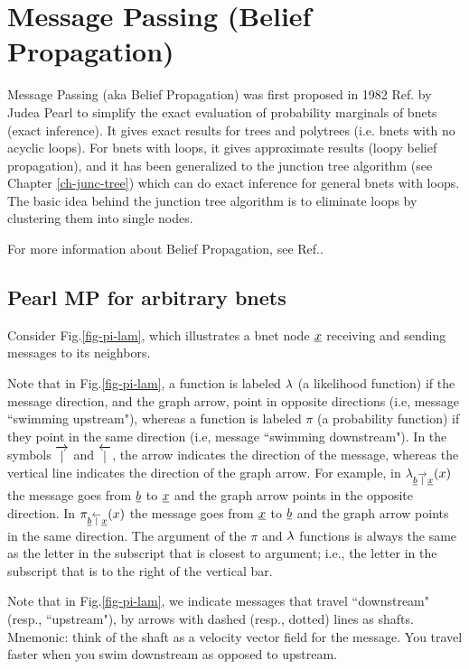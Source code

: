 \chapter{Message Passing 
(Belief Propagation)}\label{ch-mp}

Message Passing (aka Belief Propagation)
was first proposed in 1982
Ref.\cite{pearl1982reverend} by Judea Pearl
to simplify
the exact evaluation of probability marginals
of bnets (exact inference).
It gives exact results for trees and
polytrees (i.e. bnets with no acyclic
loops). For bnets with loops,
it gives approximate results 
(loopy belief propagation),
and it has been generalized to
the junction tree algorithm 
(see Chapter \ref{ch-junc-tree})
which can do exact inference
for general bnets with loops.
The basic idea behind
the junction tree algorithm
is to eliminate 
loops by clustering
them into single nodes.

For more information
about Belief Propagation,
see Ref.\cite{wiki-mp}.


\section*{Pearl MP for arbitrary bnets}



Consider Fig.\ref{fig-pi-lam},
which illustrates
a bnet node ${\underline{x}}$ receiving and sending
messages to its neighbors.

Note that in Fig.\ref{fig-pi-lam}, 
a function is labeled
$\lambda$ (a likelihood
function)  if the
message direction,
 and the  graph arrow,
 point in opposite directions
(i.e, message ``swimming upstream"),
whereas a 
function is labeled $\pi$
(a probability function)  if 
they point in the same direction
(i.e, message ``swimming downstream").
In the symbols $\overrightarrow{|}$
and $\overleftarrow{|}$, the arrow
indicates  the direction of the message,
whereas the vertical line indicates
the direction of the graph arrow.
For  example, in 
$\lambda_{{\underline{b}}\overrightarrow{|}{\underline{x}}}(x)$
the message goes from
${\underline{b}}$ to ${\underline{x}}$ and the 
graph arrow
points in the opposite direction.
In 
$\pi_{{\underline{b}}\overleftarrow{|}{\underline{x}}}(x)$
the message goes from
${\underline{x}}$ to ${\underline{b}}$ and the 
graph arrow
points in the same direction.
The argument of the $\pi$
and $\lambda$
functions is always the same 
as the letter in the subscript 
that is closest to argument; i.e., the
letter in the subscript that is
to the right of the vertical bar.

Note that in Fig.\ref{fig-pi-lam},
we indicate
messages that travel 
``downstream" 
(resp., ``upstream"), by
arrows with dashed (resp., dotted)
 lines as shafts.
Mnemonic: think of the shaft as a
 velocity vector field
for the message. 
You travel faster when
you swim downstream as opposed
to upstream.


